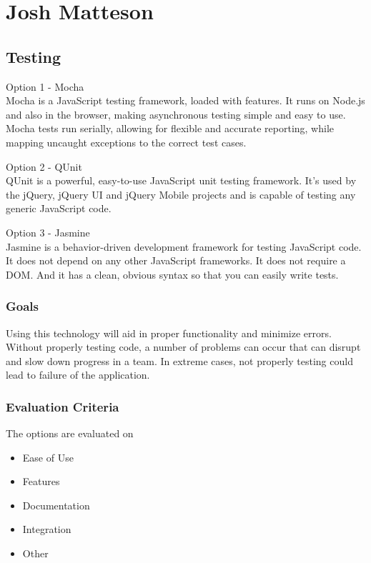 \documentclass[onecolumn, draftclsnofoot,10pt, compsoc]{IEEEtran}
\begin{document}
{%
\newpage
\section{Josh Matteson}


\subsection{Testing}
\noindent Option 1 - Mocha \\
\noindent Mocha is a JavaScript testing framework, loaded with features. It runs on Node.js and also in the browser, making asynchronous testing simple and easy to use. Mocha tests run serially, allowing for flexible and accurate reporting, while mapping uncaught exceptions to the correct test cases. \cite{Mocha} \\

\medskip

\noindent Option 2 - QUnit \\
\noindent QUnit is a powerful, easy-to-use JavaScript unit testing framework. It's used by the jQuery, jQuery UI and jQuery Mobile projects and is capable of testing any generic JavaScript code. \cite{QUnit}  \\

\medskip

\noindent Option 3 - Jasmine \\
\noindent Jasmine is a behavior-driven development framework for testing JavaScript code. It does not depend on any other JavaScript frameworks. It does not require a DOM. And it has a clean, obvious syntax so that you can easily write tests. \cite{Jasmine}  \\

\subsubsection{Goals}
\noindent Using this technology will aid in proper functionality and minimize errors. Without properly testing code, a number of problems can occur that can disrupt and slow down progress in a team. In extreme cases, not properly testing could lead to failure of the application.\\

\subsubsection{Evaluation Criteria}
\noindent The options are evaluated on
\begin{itemize}
\item Ease of Use
\item Features
\item Documentation
\item Integration
\item Other
\end{itemize}


}
\end{document}
